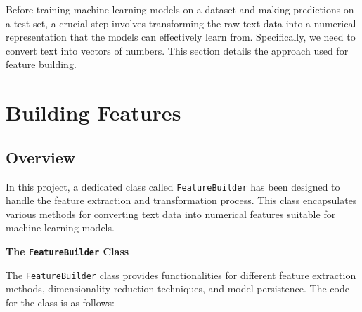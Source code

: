 Before training machine learning models on a dataset and making predictions on a test set, a crucial step involves transforming the raw text data into a numerical representation that the models can effectively learn from. Specifically, we need to convert text into vectors of numbers. This section details the approach used for feature building.

\section{Building Features}

\subsection{Overview}

In this project, a dedicated class called \texttt{FeatureBuilder} has been designed to handle the feature extraction and transformation process. This class encapsulates various methods for converting text data into numerical features suitable for machine learning models.

\textbf{The \texttt{FeatureBuilder} Class}

The \texttt{FeatureBuilder} class provides functionalities for different feature extraction methods, dimensionality reduction techniques, and model persistence. The code for the class is as follows:

